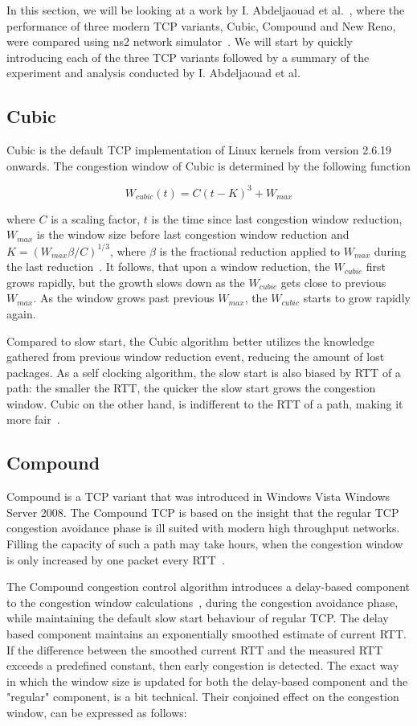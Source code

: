 In this section, we will be looking at a work by I. Abdeljaouad et al.~\cite{Abdeljaouad10}, where the performance of three modern TCP variants, Cubic, Compound and New Reno, were compared using ns2 network simulator~\cite{Singh12}. We will start by quickly introducing each of the three TCP variants followed by a summary of the experiment and analysis conducted by I. Abdeljaouad et al.

\subsection{Cubic}

Cubic is the default TCP implementation of Linux kernels from version 2.6.19 onwards. The congestion window of Cubic is determined by the following function

\[
W_{cubic}(t) = C(t - K)^3 + W_{max}   
\]

where $C$ is a scaling factor, $t$ is the time since last congestion window reduction, $W_{max}$ is the window size before last congestion window reduction and $K = (W_{max} \beta / C)^{1 / 3}$, where $\beta$ is the fractional reduction applied to $W_{max}$ during the last reduction~\cite{Ha08}. It follows, that upon a window reduction, the $W_{cubic}$ first grows rapidly, but the growth slows down as the $W_{cubic}$ gets close to previous $W_{max}$. As the window grows past previous $W_{max}$, the $W_{cubic}$ starts to grow rapidly again. 

Compared to slow start, the Cubic algorithm better utilizes the knowledge gathered from previous window reduction event, reducing the amount of lost packages. As a self clocking algorithm, the slow start is also biased by RTT of a path: the smaller the RTT, the quicker the slow start grows the congestion window. Cubic on the other hand, is indifferent to the RTT of a path, making it more fair~\cite{Ha08}. 

\subsection{Compound}

Compound is a TCP variant that was introduced in Windows Vista Windows Server 2008. The Compound TCP is based on the insight that the regular TCP congestion avoidance phase is ill suited with modern high throughput networks. Filling the capacity of such a path may take hours, when the congestion window is only increased by one packet every RTT~\cite{Tan05}.

The Compound congestion control algorithm introduces a delay-based component to the congestion window calculations~\cite{Tan05}, during the congestion avoidance phase, while maintaining the default slow start behaviour of regular TCP. The delay based component maintains an exponentially smoothed estimate of current RTT. If the difference between the smoothed current RTT and the measured RTT exceeds a predefined constant, then early congestion is detected. The exact way in which the window size is updated for both the delay-based component and the "regular" component, is a bit technical. Their conjoined effect on the congestion window, can be expressed as follows:

